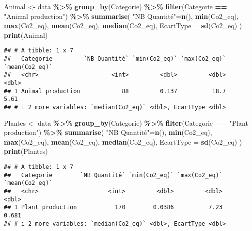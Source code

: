 \documentclass[
]{article}
\newenvironment{Shaded}{\begin{snugshade}}{\end{snugshade}}
\newcommand{\AttributeTok}[1]{\textcolor[rgb]{0.13,0.29,0.53}{#1}}
\newcommand{\FunctionTok}[1]{\textcolor[rgb]{0.13,0.29,0.53}{\textbf{#1}}}
\newcommand{\NormalTok}[1]{#1}
\newcommand{\OtherTok}[1]{\textcolor[rgb]{0.56,0.35,0.01}{#1}}
\newcommand{\SpecialCharTok}[1]{\textcolor[rgb]{0.81,0.36,0.00}{\textbf{#1}}}
\newcommand{\StringTok}[1]{\textcolor[rgb]{0.31,0.60,0.02}{#1}}
\begin{document}
\begin{Shaded}
\begin{Highlighting}[]
\NormalTok{Animal }\OtherTok{\textless{}{-}}\NormalTok{ data }\SpecialCharTok{\%\textgreater{}\%} 
  \FunctionTok{group\_by}\NormalTok{(Categorie) }\SpecialCharTok{\%\textgreater{}\%}
  \FunctionTok{filter}\NormalTok{(Categorie }\SpecialCharTok{==} \StringTok{"Animal production"}\NormalTok{) }\SpecialCharTok{\%\textgreater{}\%} 
  \FunctionTok{summarise}\NormalTok{(}
    \StringTok{"NB Quantité"}\OtherTok{=}\FunctionTok{n}\NormalTok{(),}
    \FunctionTok{min}\NormalTok{(Co2\_eq),}
    \FunctionTok{max}\NormalTok{(Co2\_eq),}
    \FunctionTok{mean}\NormalTok{(Co2\_eq),}
    \FunctionTok{median}\NormalTok{(Co2\_eq),}
    \AttributeTok{EcartType =} \FunctionTok{sd}\NormalTok{(Co2\_eq)}
\NormalTok{  )}
\FunctionTok{print}\NormalTok{(Animal)}
\end{Highlighting}
\end{Shaded}

\begin{verbatim}
## # A tibble: 1 x 7
##   Categorie         `NB Quantité` `min(Co2_eq)` `max(Co2_eq)` `mean(Co2_eq)`
##   <chr>                     <int>         <dbl>         <dbl>          <dbl>
## 1 Animal production            88         0.137          18.7           5.61
## # i 2 more variables: `median(Co2_eq)` <dbl>, EcartType <dbl>
\end{verbatim}

\begin{Shaded}
\begin{Highlighting}[]
\NormalTok{Plantes }\OtherTok{\textless{}{-}}\NormalTok{ data }\SpecialCharTok{\%\textgreater{}\%} 
  \FunctionTok{group\_by}\NormalTok{(Categorie) }\SpecialCharTok{\%\textgreater{}\%}
  \FunctionTok{filter}\NormalTok{(Categorie }\SpecialCharTok{==} \StringTok{"Plant production"}\NormalTok{) }\SpecialCharTok{\%\textgreater{}\%} 
  \FunctionTok{summarise}\NormalTok{(}
    \StringTok{"NB Quantité"}\OtherTok{=}\FunctionTok{n}\NormalTok{(),}
    \FunctionTok{min}\NormalTok{(Co2\_eq),}
    \FunctionTok{max}\NormalTok{(Co2\_eq),}
    \FunctionTok{mean}\NormalTok{(Co2\_eq),}
    \FunctionTok{median}\NormalTok{(Co2\_eq),}
    \AttributeTok{EcartType =} \FunctionTok{sd}\NormalTok{(Co2\_eq)}
\NormalTok{  )}
\FunctionTok{print}\NormalTok{(Plantes)}
\end{Highlighting}
\end{Shaded}

\begin{verbatim}
## # A tibble: 1 x 7
##   Categorie        `NB Quantité` `min(Co2_eq)` `max(Co2_eq)` `mean(Co2_eq)`
##   <chr>                    <int>         <dbl>         <dbl>          <dbl>
## 1 Plant production           170        0.0386          7.23          0.681
## # i 2 more variables: `median(Co2_eq)` <dbl>, EcartType <dbl>
\end{verbatim}
\end{document}
